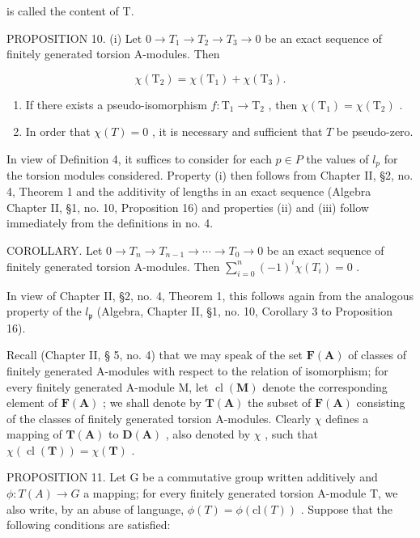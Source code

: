 is called the content of T.

PROPOSITION 10. (i) Let \(0 \to T_1 \to T_2 \to T_3 \to 0\) be an exact sequence of finitely generated torsion A-modules. Then

\[
\chi (\mathrm{T} _ {2}) = \chi (\mathrm{T} _ {1}) + \chi (\mathrm{T} _ {3}).
\]

\begin{enumerate}
\def\labelenumi{(\roman{enumi})}
\setcounter{enumi}{1}
\item
  If there exists a pseudo-isomorphism \(f \colon \mathrm{T}_1 \to \mathrm{T}_2\) , then \(\chi(\mathrm{T}_1) = \chi(\mathrm{T}_2)\) .
\item
  In order that \(\chi(T) = 0\) , it is necessary and sufficient that \(T\) be pseudo-zero.
\end{enumerate}

In view of Definition 4, it suffices to consider for each \(p \in P\) the values of \(l_{p}\) for the torsion modules considered. Property (i) then follows from Chapter II, §2, no. 4, Theorem 1 and the additivity of lengths in an exact sequence (Algebra Chapter II, §1, no. 10, Proposition 16) and properties (ii) and (iii) follow immediately from the definitions in no. 4.

COROLLARY. Let \(0 \to T_n \to T_{n-1} \to \cdots \to T_0 \to 0\) be an exact sequence of finitely generated torsion A-modules. Then \(\sum_{i=0}^{n} (-1)^i \chi(T_i) = 0\) .

In view of Chapter II, §2, no. 4, Theorem 1, this follows again from the analogous property of the \(l_{\mathfrak{p}}\) (Algebra, Chapter II, §1, no. 10, Corollary 3 to Proposition 16).

Recall (Chapter II, § 5, no. 4) that we may speak of the set \(\mathbf{F}(\mathbf{A})\) of classes of finitely generated A-modules with respect to the relation of isomorphism; for every finitely generated A-module M, let \(\operatorname{cl}(\mathbf{M})\) denote the corresponding element of \(\mathbf{F}(\mathbf{A})\) ; we shall denote by \(\mathbf{T}(\mathbf{A})\) the subset of \(\mathbf{F}(\mathbf{A})\) consisting of the classes of finitely generated torsion A-modules. Clearly \(\chi\) defines a mapping of \(\mathbf{T}(\mathbf{A})\) to \(\mathbf{D}(\mathbf{A})\) , also denoted by \(\chi\) , such that \(\chi(\operatorname{cl}(\mathbf{T})) = \chi(\mathbf{T})\) .

PROPOSITION 11. Let G be a commutative group written additively and \(\phi: T(A) \to G\) a mapping; for every finitely generated torsion A-module T, we also write, by an abuse of language, \(\phi(T) = \phi(\text{cl}(T))\) . Suppose that the following conditions are satisfied:

